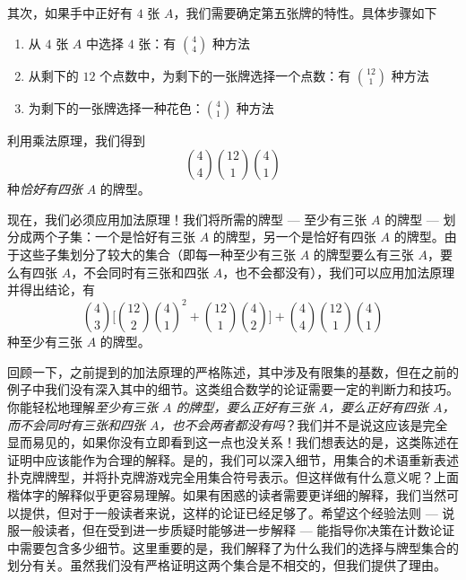 \begin{example}[至少三张 $A$]
    其次，如果手中正好有 $4$ 张 $A$，我们需要确定第五张牌的特性。具体步骤如下
    \begin{enumerate}
        \item 从 $4$ 张 $A$ 中选择 $4$ 张：有 ${4 \choose 4}$ 种方法
        \item 从剩下的 $12$ 个点数中，为剩下的一张牌选择一个点数：有 ${12 \choose 1}$ 种方法
        \item 为剩下的一张牌选择一种花色：${4 \choose 1}$ 种方法
    \end{enumerate}
    利用乘法原理，我们得到
    \[{4 \choose 4}{12 \choose 1}{4 \choose 1}\]
    种\emph{恰好有四张} $A$ 的牌型。

    现在，我们必须应用加法原理！我们将所需的牌型 --- 至少有三张 $A$ 的牌型 --- 划分成两个子集：一个是恰好有三张 $A$ 的牌型，另一个是恰好有四张 $A$ 的牌型。由于这些子集划分了较大的集合（即每一种至少有三张 $A$ 的牌型要么有三张 $A$，要么有四张 $A$，不会同时有三张和四张 $A$，也不会都没有），我们可以应用加法原理并得出结论，有
    \[{4 \choose 3}\Bigg[{12 \choose 2} {4 \choose 1}^2 + {12 \choose 1} {4 \choose 2}\Bigg] + {4 \choose 4}{12 \choose 1}{4 \choose 1}\]
    种至少有三张 $A$ 的牌型。

    回顾一下，之前提到的加法原理的严格陈述，其中涉及有限集的基数，但在之前的例子中我们没有深入其中的细节。这类组合数学的论证需要一定的判断力和技巧。你能轻松地理解\emph{至少有三张 $A$ 的牌型，要么正好有三张 $A$，要么正好有四张 $A$，而不会同时有三张和四张 $A$，也不会两者都没有吗}？我们并不是说这应该是完全显而易见的，如果你没有立即看到这一点也没关系！我们想表达的是，这类陈述在证明中应该能作为合理的解释。是的，我们可以深入细节，用集合的术语重新表述扑克牌牌型，并将扑克牌游戏完全用集合符号表示。但这样做有什么意义呢？上面楷体字的解释似乎更容易理解。如果有困惑的读者需要更详细的解释，我们当然可以提供，但对于一般读者来说，这样的论证已经足够了。希望这个经验法则 --- 说服一般读者，但在受到进一步质疑时能够进一步解释 --- 能指导你决策在计数论证中需要包含多少细节。这里重要的是，我们解释了为什么我们的选择与牌型集合的划分有关。虽然我们没有严格证明这两个集合是不相交的，但我们提供了理由。


\end{example}
